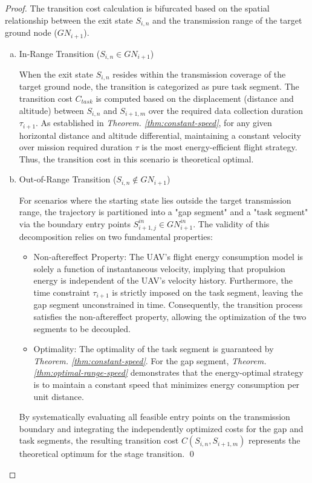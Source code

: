 \begin{proof}
    The transition cost calculation is bifurcated based on the spatial relationship between the exit state $S_{i,n}$ and the transmission range of the target ground node ($GN_{i+1}$).

    \begin{enumerate}[a)]
    \item In-Range Transition ($S_{i,n} \in GN_{i+1}$)

    When the exit state $S_{i,n}$ resides within the transmission coverage of the target ground node, the transition is categorized as pure task segment.
    The transition cost $C_{task}$ is computed based on the displacement (distance and altitude) between $S_{i,n}$ and $S_{i+1,m}$ over the required data collection duration $\tau_{i+1}$.
    As established in \textit{Theorem. \ref{thm:constant-speed}}, for any given horizontal distance and altitude differential, maintaining a constant velocity over mission required duration $\tau$ is the most energy-efficient flight strategy.
    Thus, the transition cost in this scenario is theoretical optimal.
    \item Out-of-Range Transition ($S_{i,n} \notin GN_{i+1}$)

    For scenarios where the starting state lies outside the target transmission range, the trajectory is partitioned into a "gap segment" and a "task segment" via the boundary entry points $S_{i+1,j}^{in} \in GN^{in}_{i+1}$.
    The validity of this decomposition relies on two fundamental properties:
        \begin{itemize}
        \item Non-aftereffect Property: The UAV’s flight energy consumption model is solely a function of instantaneous velocity, implying that propulsion energy is independent of the UAV's velocity history.
        Furthermore, the time constraint $\tau_{i+1}$ is strictly imposed on the task segment, leaving the gap segment unconstrained in time.
        Consequently, the transition process satisfies the non-aftereffect property, allowing the optimization of the two segments to be decoupled.
        \item Optimality: The optimality of the task segment is guaranteed by \textit{Theorem. \ref{thm:constant-speed}}.
        For the gap segment, \textit{Theorem. \ref{thm:optimal-range-speed}} demonstrates that the energy-optimal strategy is to maintain a constant speed that minimizes energy consumption per unit distance.
        \end{itemize}  
    By systematically evaluating all feasible entry points on the transmission boundary and integrating the independently optimized costs for the gap and task segments, the resulting transition cost $C(S_{i,n}, S_{i+1,m})$ represents the theoretical optimum for the stage transition.
    \qed
    \end{enumerate}  
\end{proof}

